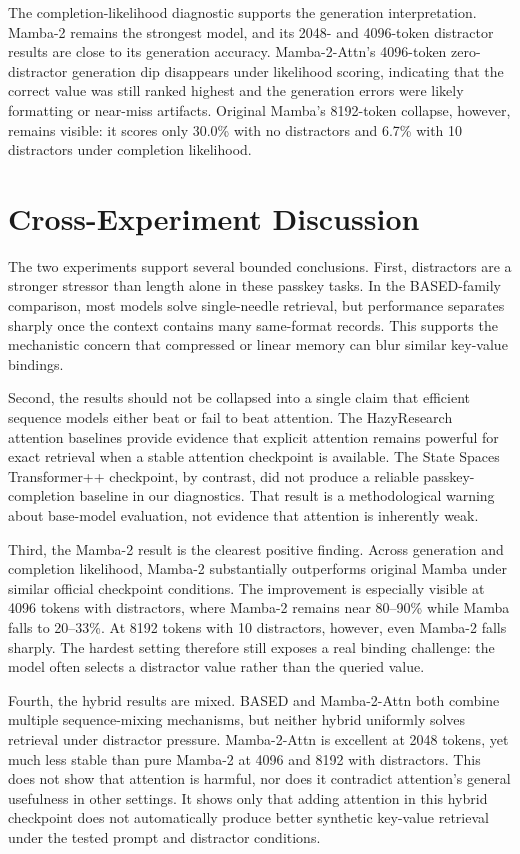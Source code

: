 \documentclass[10pt]{article}
\begin{document}
The completion-likelihood diagnostic supports the generation interpretation.
Mamba-2 remains the strongest model, and its 2048- and 4096-token distractor
results are close to its generation accuracy. Mamba-2-Attn's 4096-token
zero-distractor generation dip disappears under likelihood scoring, indicating
that the correct value was still ranked highest and the generation errors were
likely formatting or near-miss artifacts. Original Mamba's 8192-token collapse,
however, remains visible: it scores only 30.0\% with no distractors and 6.7\%
with 10 distractors under completion likelihood.

\FloatBarrier

\section{Cross-Experiment Discussion}

The two experiments support several bounded conclusions. First, distractors
are a stronger stressor than length alone in these passkey tasks. In the
BASED-family comparison, most models solve single-needle retrieval, but
performance separates sharply once the context contains many same-format
records. This supports the mechanistic concern that compressed or linear memory
can blur similar key-value bindings.

Second, the results should not be collapsed into a single claim that efficient
sequence models either beat or fail to beat attention. The HazyResearch
attention baselines provide evidence that explicit attention remains powerful
for exact retrieval when a stable attention checkpoint is available. The State
Spaces Transformer++ checkpoint, by contrast, did not produce a reliable
passkey-completion baseline in our diagnostics. That result is a
methodological warning about base-model evaluation, not evidence that attention
is inherently weak.

Third, the Mamba-2 result is the clearest positive finding. Across generation
and completion likelihood, Mamba-2 substantially outperforms original Mamba
under similar official checkpoint conditions. The improvement is especially
visible at 4096 tokens with distractors, where Mamba-2 remains near 80--90\%
while Mamba falls to 20--33\%. At 8192 tokens with 10 distractors, however,
even Mamba-2 falls sharply. The hardest setting therefore still exposes a real
binding challenge: the model often selects a distractor value rather than the
queried value.

Fourth, the hybrid results are mixed. BASED and Mamba-2-Attn both combine
multiple sequence-mixing mechanisms, but neither hybrid uniformly solves
retrieval under distractor pressure. Mamba-2-Attn is excellent at 2048 tokens,
yet much less stable than pure Mamba-2 at 4096 and 8192 with distractors. This
does not show that attention is harmful, nor does it contradict attention's
general usefulness in other settings. It shows only that adding attention in
this hybrid checkpoint does not automatically produce better synthetic
key-value retrieval under the tested prompt and distractor conditions.
\end{document}
